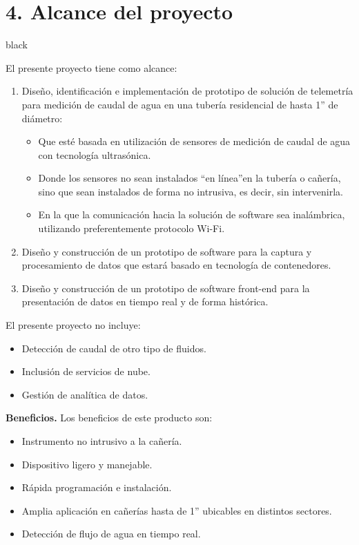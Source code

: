 \documentclass[
11pt, %
codirector, %
]{charter}
\begin{document}
\section{4. Alcance del proyecto}
\label{sec:alcance}

\begin{consigna}{black}

El presente proyecto tiene como alcance:

\begin{enumerate}
\item Diseño, identificación e implementación de prototipo de solución de telemetría para medición de caudal de agua en una tubería residencial de hasta 1'' de diámetro:
\begin{itemize}
	\item Que esté basada en utilización de sensores de medición de caudal de agua con tecnología ultrasónica.
	\item Donde los sensores no sean instalados \textquotedblleft{en línea}\textquotedblright  en la tubería o cañería, sino que sean instalados de forma no intrusiva, es decir, sin intervenirla.
	\item En la que la comunicación hacia la solución de software sea inalámbrica, utilizando preferentemente protocolo Wi-Fi.
\end{itemize}

\item Diseño y construcción de un prototipo de software para la captura y procesamiento de datos que estará basado en tecnología de contenedores.

\item Diseño y construcción de un prototipo de software front-end para la presentación de datos en tiempo real y de forma histórica.

\end{enumerate}

El presente proyecto no incluye:

\begin{itemize}
	\item Detección de caudal de otro tipo de fluidos.
	\item Inclusión de servicios de nube.
	\item Gestión de analítica de datos.
\end{itemize}

\textbf{Beneficios.}  
Los beneficios de este producto son:
\begin{itemize}
	\item Instrumento no intrusivo a la cañería.
	\item Dispositivo ligero y manejable.
	\item Rápida programación e instalación.
	\item Amplia aplicación en cañerías hasta de 1'' ubicables en distintos sectores.
	\item Detección de flujo de agua en tiempo real.
\end{itemize}
\end{consigna}
\end{document}
